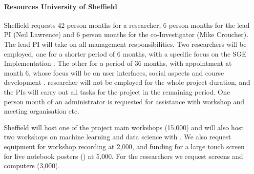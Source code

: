 \paragraph{Resources University of Sheffield}

Sheffield requests 42 person months for a researcher, 6 person months
for the lead PI (Neil Lawrence) and 6 person months for the
co-Investigator (Mike Croucher). The lead PI will take on all
management responsibilities. Two researchers will be employed, one for
a shorter period of 6 months, with a specific focus on the SGE
Implementation . The other for a period of
36 months, with appointment at month 6, whose focus will be on user
interfaces, social aspects  and
course development .  researcher will
not be employed for the whole project duration, and the PIs will carry
out all tasks for the project in the remaining period. One person
month of an administrator is requested for assistance with workshop
and meeting organisation etc.

Sheffield will host one of the project main workshops (15,000) and will also host two
workshops on machine learning and data science with \TheProject. We also request equipment
for workshop recording at 2,000, and funding for a large touch screen for live notebook
posters () at 5,000. For the researchers we
request screens and computers (3,000).


